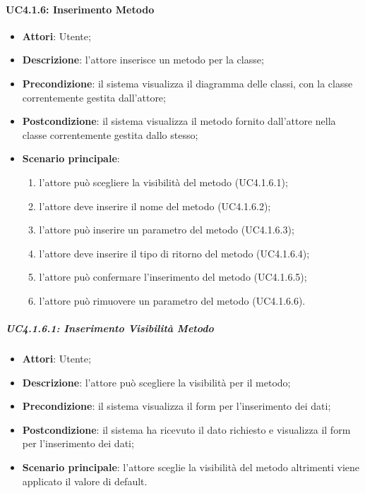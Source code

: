 \paragraph{UC4.1.6: Inserimento Metodo}
\label{UC4.1.6}
\begin{itemize}
	\item \textbf{Attori}: Utente;
	\item \textbf{Descrizione}: l'attore inserisce un metodo per la classe;
	\item \textbf{Precondizione}: il sistema visualizza il diagramma delle classi, con la classe correntemente gestita dall'attore;
	\item \textbf{Postcondizione}: il sistema visualizza il metodo fornito dall'attore nella classe correntemente gestita dallo stesso;
	\item \textbf{Scenario principale}:
	\begin{enumerate}
		\item l'attore può scegliere la visibilità del metodo (UC4.1.6.1);
		\item l'attore deve inserire il nome del metodo (UC4.1.6.2);
		\item l'attore può inserire un parametro del metodo (UC4.1.6.3);
		\item l'attore deve inserire il tipo di ritorno del metodo (UC4.1.6.4);
		\item l'attore può confermare l'inserimento del metodo (UC4.1.6.5);
		\item l'attore può rimuovere un parametro del metodo (UC4.1.6.6).
	\end{enumerate}
\end{itemize}

\subparagraph{UC4.1.6.1: Inserimento Visibilità Metodo}
\label{UC4.1.6.1}
\begin{itemize}
	\item \textbf{Attori}: Utente;
	\item \textbf{Descrizione}: l'attore può scegliere la visibilità per il metodo;
	\item \textbf{Precondizione}: il sistema visualizza il form per l'inserimento dei dati;
	\item \textbf{Postcondizione}: il sistema ha ricevuto il dato richiesto e visualizza il form per l'inserimento dei dati;
	\item \textbf{Scenario principale}: l'attore sceglie la visibilità del metodo altrimenti viene applicato il valore di default.
\end{itemize}

